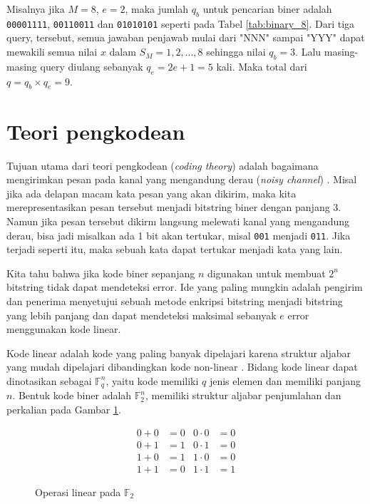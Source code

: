 Misalnya jika $M=8$, $e=2$, maka jumlah $q_b$ untuk pencarian biner adalah \texttt{00001111}, \texttt{00110011} dan \texttt{01010101} seperti pada Tabel \ref{tab:binary_8}. Dari tiga query, tersebut, semua jawaban penjawab mulai dari "NNN" sampai "YYY" dapat mewakili semua nilai $x$ dalam $S_M={1,2,...,8}$ sehingga nilai $q_b=3$. Lalu masing-masing query diulang sebanyak $q_e=2e+1=5$ kali. Maka total dari $q=q_b \times q_e=9$.


\section{Teori pengkodean}

Tujuan utama dari teori pengkodean (\textit{coding theory}) adalah bagaimana mengirimkan pesan pada kanal yang mengandung derau (\textit{noisy channel}) \cite{VanLint2016}. Misal jika ada delapan macam kata pesan yang akan dikirim, maka kita merepresentasikan pesan tersebut menjadi bitstring biner dengan panjang 3. Namun jika pesan tersebut dikirm langsung melewati kanal yang mengandung derau, bisa jadi misalkan ada 1 bit akan tertukar, misal \texttt{001} menjadi \texttt{011}. Jika terjadi seperti itu, maka sebuah kata dapat tertukar menjadi kata yang lain.

Kita tahu bahwa jika kode biner sepanjang $n$ digunakan untuk membuat $2^n$ bitstring tidak dapat mendeteksi error. Ide yang paling mungkin adalah pengirim dan penerima menyetujui sebuah metode enkripsi bitstring menjadi bitstring yang lebih panjang dan dapat mendeteksi maksimal sebanyak $e$ error menggunakan kode linear.

Kode linear adalah kode yang paling banyak dipelajari karena struktur aljabar yang mudah dipelajari dibandingkan kode non-linear \cite{Huffman}. Bidang kode linear dapat dinotasikan sebagai $\mathbb{F}_q^n$, yaitu kode memiliki $q$ jenis elemen dan memiliki panjang $n$. Bentuk kode biner adalah $\mathbb{F}_2^n$, memiliki struktur aljabar penjumlahan dan perkalian pada Gambar \ref{fig:algebra}.

\begin{figure}
\centering
\begin{align*}
0 + 0 &= 0 & 0 \cdot 0 &= 0 \\
0 + 1 &= 1 & 0 \cdot 1 &= 0 \\
1 + 0 &= 1 & 1 \cdot 0 &= 0 \\
1 + 1 &= 0 & 1 \cdot 1 &= 1
\end{align*}
\caption{Operasi linear pada $\mathbb{F}_2$}
\label{fig:algebra}
\end{figure}

